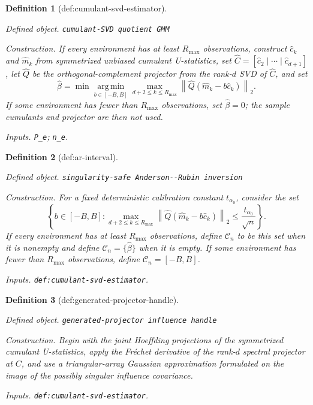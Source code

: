 \documentclass{article}
\newtheorem{definition}{Definition}
\begin{document}
\begin{definition}[def:cumulant-svd-estimator]\label{def:cumulant-svd-estimator}
\par\smallskip\noindent\emph{Defined object.} \texttt{cumulant-\allowbreak{}SVD quotient GMM}
\par\smallskip\noindent\emph{Construction.} If every environment has at least \(R_{\max}\) observations, construct \(\widehat c_k\) and \(\widehat m_k\) from symmetrized unbiased cumulant U-statistics, set \(\widehat C=[\widehat c_2\mid\cdots\mid\widehat c_{d+1}]\), let \(\widehat Q\) be the orthogonal-complement projector from the rank-\(d\) SVD of \(\widehat C\), and set
\[
 \widehat\beta=\min\operatorname*{arg\,min}_{b\in[-B,B]}
 \max_{d+2\leq k\leq R_{\max}}
 \left\lVert\widehat Q(\widehat m_k-b\widehat c_k)\right\rVert_2.
\]
If some environment has fewer than \(R_{\max}\) observations, set \(\widehat\beta=0\); the sample cumulants and projector are then not used.
\par\smallskip\noindent\emph{Inputs.} \texttt{P\_\allowbreak{}e}; \texttt{n\_\allowbreak{}e}.
\end{definition}

\begin{definition}[def:ar-interval]\label{def:ar-interval}
\par\smallskip\noindent\emph{Defined object.} \texttt{singularity-\allowbreak{}safe Anderson-\allowbreak{}-\allowbreak{}Rubin inversion}
\par\smallskip\noindent\emph{Construction.} For a fixed deterministic calibration constant \(t_{\alpha_0}\), consider the set
\[
 \left\{b\in[-B,B]:
 \max_{d+2\leq k\leq R_{\max}}
 \left\lVert\widehat Q(\widehat m_k-b\widehat c_k)\right\rVert_2
 \leq \frac{t_{\alpha_0}}{\sqrt n}\right\}.
\]
If every environment has at least \(R_{\max}\) observations, define \(\mathcal C_n\) to be this set when it is nonempty and define \(\mathcal C_n=\{\widehat\beta\}\) when it is empty.  If some environment has fewer than \(R_{\max}\) observations, define \(\mathcal C_n=[-B,B]\).
\par\smallskip\noindent\emph{Inputs.} \texttt{def:\allowbreak{}cumulant-\allowbreak{}svd-\allowbreak{}estimator}.
\end{definition}

\begin{definition}[def:generated-projector-handle]\label{def:generated-projector-handle}
\par\smallskip\noindent\emph{Defined object.} \texttt{generated-\allowbreak{}projector influence handle}
\par\smallskip\noindent\emph{Construction.} Begin with the joint Hoeffding projections of the symmetrized cumulant U-statistics, apply the Fréchet derivative of the rank-\(d\) spectral projector at \(C\), and use a triangular-array Gaussian approximation formulated on the image of the possibly singular influence covariance.
\par\smallskip\noindent\emph{Inputs.} \texttt{def:\allowbreak{}cumulant-\allowbreak{}svd-\allowbreak{}estimator}.
\end{definition}
\end{document}

